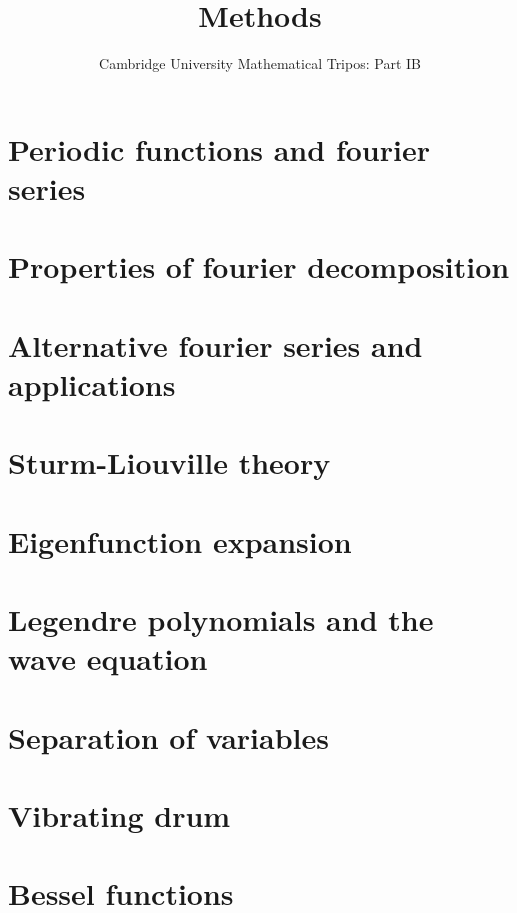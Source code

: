 \documentclass{article}
\title{Methods}
\author{Cambridge University Mathematical Tripos: Part IB}
\begin{document}
\maketitle

\tableofcontentsnewpage{}

\section{Periodic functions and fourier series}

\section{Properties of fourier decomposition}

\section{Alternative fourier series and applications}

\section{Sturm-Liouville theory}

\section{Eigenfunction expansion}

\section{Legendre polynomials and the wave equation}

\section{Separation of variables}

\section{Vibrating drum}

\section{Bessel functions}

\end{document}
